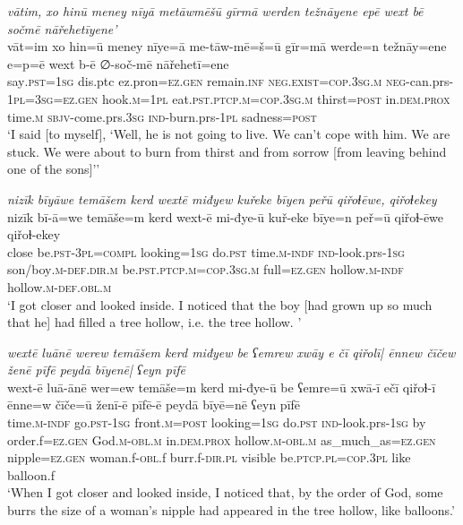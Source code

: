 \ea \label{ZQ.25}
\textit{vātim, xo hinū meney nīyā metāwmēšū gīrmā werden težnāyene epē wext bē sočmē nāřehetīyene’} \\ 
\gll vāt=im xo hin=ū meney nīye=ā me-tāw-mē=š=ū gīr=mā werde=n težnāy=ene e=p=ē wext b-ē ∅-soč-mē nāřehetī=ene \\ 
 say\textsc{.pst}\textsc{=\textsc{1sg}} dis.ptc ez.pron\textsc{=ez.gen} remain\textsc{.inf} \textsc{\textsc{neg.}exist}\textsc{=cop}\textsc{.3sg}\textsc{.m} \textsc{neg-}can.prs\textsc{-\textsc{1pl}}\textsc{=3sg}\textsc{=ez.gen} hook\textsc{.m}\textsc{=\textsc{1pl}} eat\textsc{.pst}\textsc{.ptcp}\textsc{.m}\textsc{=cop}\textsc{.3sg}\textsc{.m} thirst\textsc{=\textsc{post}} in.\textsc{dem.prox} time\textsc{.m} \textsc{sbjv-}come.prs\textsc{.3sg} \textsc{ind-}burn.prs\textsc{-\textsc{1pl}} sadness\textsc{=\textsc{post}} \\ 
\glt `I said [to myself], ‘Well, he is not going to live. We can’t cope with him. We are stuck. We were about to burn from thirst and from sorrow [from leaving behind one of the sons]’'
\z 
 
\ea \label{ZQ.38}
\textit{nizīk bīyāwe temāšem kerd wextē miđyew kuřeke bīyen peřū qiřoɫēwe, qiřoɫekey} \\ 
\gll nizīk bī-ā=we temāše=m kerd wext-ē mi-đye-ū kuř-eke bīye=n peř=ū qiřoɫ-ēwe qiřoɫ-ekey \\ 
 close be\textsc{.pst}\textsc{-3pl}\textsc{=compl} looking\textsc{=\textsc{1sg}} do\textsc{.pst} time\textsc{.m}\textsc{-indf} \textsc{ind-}look.prs\textsc{-\textsc{1sg}} son/boy\textsc{.m}\textsc{-def}\textsc{.dir}\textsc{.m} be\textsc{.pst}\textsc{.ptcp}\textsc{.m}\textsc{=cop}\textsc{.3sg}\textsc{.m} full\textsc{=ez.gen} hollow\textsc{.m}\textsc{-indf} hollow\textsc{.m}\textsc{-def}\textsc{.obl}\textsc{.m} \\ 
\glt `I got closer and looked inside. I noticed that the boy [had grown up so much that he] had filled a tree hollow, i.e. the tree hollow. '
\z 
 
\ea \label{ZQ.39}
\textit{wextē luānē werew temāšem kerd miđyew be ʕemrew xwāy e čī qiřolī| ēnnew čīčew ženē pīfē peydā bīyenē| ʕeyn pīfē} \\ 
\gll wext-ē luā-ānē wer=ew temāše=m kerd mi-đye-ū be ʕemre=ū xwā-ī ečī qiřoɫ-ī ēnne=w čīče=ū ženī-ē pīfē-ē peydā bīyē=nē ʕeyn pīfē \\ 
 time\textsc{.m}\textsc{-indf} go\textsc{.pst}\textsc{-\textsc{1sg}} front\textsc{.m}\textsc{=\textsc{post}} looking\textsc{=\textsc{1sg}} do\textsc{.pst} \textsc{ind-}look.prs\textsc{-\textsc{1sg}} by order.f\textsc{=ez.gen} God\textsc{.m}\textsc{-obl}\textsc{.m} in.\textsc{dem.prox} hollow\textsc{.m}\textsc{-obl}\textsc{.m} as\_much\_as\textsc{=ez.gen} nipple\textsc{=ez.gen} woman.f\textsc{-obl}.f burr.f\textsc{-dir}\textsc{.pl} visible be\textsc{.ptcp}\textsc{.pl}\textsc{=cop}\textsc{.3pl} like balloon.f \\ 
\glt `When I got closer and looked inside, I noticed that, by the order of God, some burrs the size of a woman's nipple had appeared in the tree hollow, like balloons.'
\z 
 
